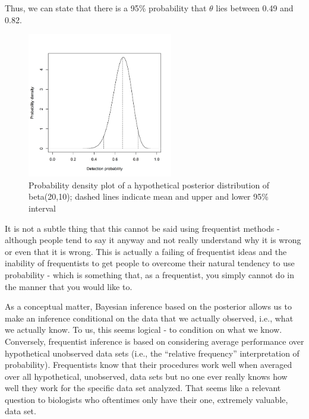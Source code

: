 Thus, we can state that there is a 95\% probability that $\theta$ lies
between 0.49 and 0.82.

\begin{figure}
\begin{center}
\includegraphics[height=2.5in]{Ch2/figs/densityvsdetection}
\end{center}
\caption{Probability density plot of a hypothetical
 posterior distribution of beta(20,10); dashed lines 
 indicate mean and upper and lower 95\% interval}
\label{densityvsdetection.fig}
\end{figure}

It is not a subtle thing that this
cannot be said using frequentist methods - although people tend to say
it anyway and not really understand why it is wrong or even that it is
wrong. This is actually a failing of frequentist ideas and the
inability of frequentists to get people to overcome their natural
tendency to use probability - which is something that, as a
frequentist, you simply cannot do in the manner that you would like
to.


As a conceptual matter, Bayesian inference based on the posterior
allows us 
 to make an inference conditional on the data that we
actually observed, i.e., what we actually know.  To us, this seems
logical - to condition on what we know. Conversely, frequentist
inference is based on considering average performance over
hypothetical unobserved data sets (i.e., the ``relative frequency''
interpretation of probability).  Frequentists know that their
procedures work well when averaged over all hypothetical, unobserved,
data sets but no one ever really knows how well they work for the
specific data set analyzed. That seems like a relevant question to
biologists who oftentimes only have their one, extremely valuable,
data set. 

